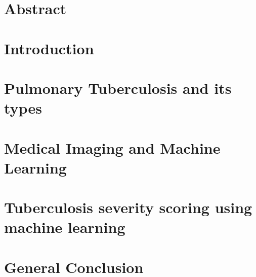 \documentclass[12pt]{report}
\begin{document}
 
\chapter*{Abstract}


\tableofcontents
\chapter*{Introduction}

\chapter{Pulmonary Tuberculosis and its types}

\chapter{Medical Imaging and Machine Learning}

\chapter{Tuberculosis severity scoring using machine learning}

\chapter*{General Conclusion}


\newpage
\printacronyms[include-classes=abbrev,name=Abbreviations]
\listoffigures
\listoftables
\newpage
 

\printbibliography[title={Online Resources},type=online]
\end{document}
